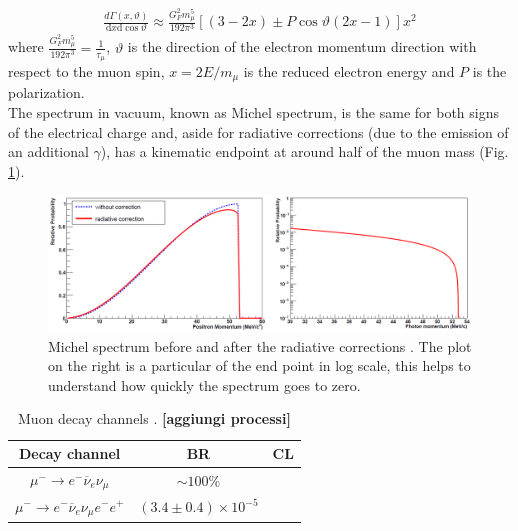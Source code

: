 \documentclass[12pt,a4paper,openright, oneside, titlepage]{book} %
\begin{document}
\begin{align}
\frac{d\Gamma(x,\vartheta)}{\mathrm dx \mathrm d\cos\vartheta}\approx \frac{G_F^2m_\mu^5}{192\pi^3}[(3-2x)\pm P\cos\vartheta(2x-1)]x^2
\label{eq_muon}
\end{align}
where $\frac{G_F^2m_\mu^5}{192\pi^3}=\frac{1}{\tau_\mu}$, $\vartheta$ is the direction of the electron momentum direction with respect to the muon spin, $x=2E/m_{\mu}$ is the reduced electron energy and $P$ is the polarization.\\
The spectrum in vacuum, known as Michel spectrum, is the same for both signs of the electrical charge and, aside for radiative corrections (due to the emission of an additional $\gamma$), has a kinematic endpoint at around half of the muon mass (Fig. \ref{_Michel}).\\

\begin{figure}[h!]
\centering
\includegraphics[scale=0.5]{Michel}
\caption{Michel spectrum before and after the radiative corrections \cite{signorelli}. The plot on the right is a particular of the end point in log scale, this helps to understand how quickly the spectrum goes to zero.}
\label{_Michel}
\end{figure}

\begin{table}
\centering
\begin{tabular}{|c|c|c|}
\hline
Decay channel & BR & CL\\
\hline
\hline
$\mu^- \rightarrow e^-\overline{\nu}_e\nu_\mu$&$\sim100\%$&\\
$\mu^- \rightarrow e^-\overline{\nu}_e\nu_\mu e^-e^+$&
$(3.4\pm0.4)\times10^{-5}$&\\
\hline
\end{tabular}
\caption{Muon decay channels \cite{PDG}. \textbf{[aggiungi processi]}}
\label{T_mu}
\end{table}
\end{document}
